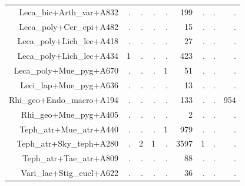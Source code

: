 \documentclass[a4paper, 11]{article}\usepackage[]{graphicx}\usepackage[]{color}
\begin{document}
\begin{table}
\begin{tabular}{rrrrrrrrr}
  Leca\_bic+Arth\_var+A832 & . & . & . & . & 199 & . & . & . \\ 
  Leca\_poly+Cer\_epi+A482 & . & . & . & . & 15 & . & . & . \\ 
  Leca\_poly+Lich\_lec+A418 & . & . & . & . & 27 & . & . & . \\ 
  Leca\_poly+Lich\_lec+A434 & 1 & . & . & . & 423 & . & . & . \\ 
  Leca\_poly+Mue\_pyg+A670 & . & . & . & 1 & 51 & . & . & . \\ 
  Leci\_lap+Mue\_pyg+A636 & . & . & . & . & 13 & . & . & . \\ 
  Rhi\_geo+Endo\_macro+A194 & . & . & . & . & 133 & . & . & 954 \\ 
  Rhi\_geo+Mue\_pyg+A405 & . & . & . & . & 2 & . & . & . \\ 
  Teph\_atr+Mue\_atr+A440 & . & . & . & 1 & 979 & . & . & . \\ 
  Teph\_atr+Sky\_teph+A280 & . & 2 & 1 & . & 3597 & 1 & . & . \\ 
  Teph\_atr+Tae\_atr+A809 & . & . & . & . & 88 & . & . & . \\ 
  Vari\_lac+Stig\_eucl+A622 & . & . & . & . & 36 & . & . & . \\ 
   \hline
\end{tabular}
\end{table}
\end{document}
